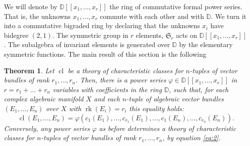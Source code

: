 \documentclass[10pt,twoside]{article}
\numberwithin{equation}{section}
\theoremstyle{plain}
\newtheorem{theorem}[equation]{Theorem}
\theoremstyle{definition}
\DeclareMathOperator{\cl}{cl}
\DeclareMathOperator{\rk}{rk}
\begin{document}
We will denote
by $\mathbb{D}[[x_{1},\dots ,x_{r}]]$ the ring of commutative formal
power series. That is, the unknowns $x_{1},\dots ,x_{r}$ commute with
each other and with $\mathbb{D}$. We turn it into a commutative
bigraded ring by declaring that the unknowns $x_{i}$ have bidegree
$(2,1)$.  The symmetric group in $r$ elements, 
$\mathfrak{S}_{r}$ 
acts on $\mathbb{D}[[x_{1},\dots ,x_{r}]]$. The subalgebra of
invariant elements is generated over $\mathbb{D}$ by the elementary
symmetric functions.   
The main result of this section is the following
\begin{theorem} \label{thm:14}
  Let $\cl$ be a theory of characteristic classes for $n$-tuples of
  vector bundles of rank $r_{1},\dots ,r_{n}$. Then, there is a power
  series $\varphi \in \mathbb{D}[[x_{1},\dots ,x_{r}]]$ in $r=r_{1}+\dots
  +r_{n}$ variables with 
  coefficients in the ring $\mathbb{D}$,
  such that, for each complex algebraic manifold $X$ and each
  $n$-tuple of
  algebraic vector bundles $(E_{1},\dots 
  ,E_{n})$ over $X$ with $\rk(E_{i})=r_{i}$ this equality holds:  
  \begin{equation}\label{eq:2}
    \cl(E_{1},\dots ,E_{n})=
    \varphi(c_{1}(E_{1}),\dots ,c_{r_{1}}(E_{1}),\dots ,
    c_{1}(E_{n}),\dots ,c_{r_{n}}(E_{n})).
  \end{equation}
  Conversely, any power series $\varphi$ as before
  determines a theory of characteristic classes for 
  $n$-tuples  of vector bundles of rank $r_{1},\dots ,r_{n}$, by
  equation \eqref{eq:2}.
\end{theorem}
\end{document}

